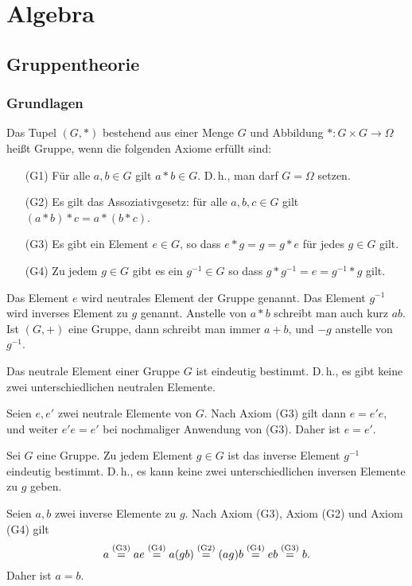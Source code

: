 
\chapter{Algebra}

\section{Gruppentheorie}

\subsection{Grundlagen}

\begin{Definition}[Gruppe]
Das Tupel $(G,*)$ bestehend aus einer Menge $G$ und
Abbildung $*\colon G\times G\to\Omega$ heißt Gruppe, wenn die folgenden
Axiome erfüllt sind:
\begin{enumerate}
\item[(G1)] Für alle $a,b\in G$ gilt $a*b\in G$. D.\,h., man darf $G=\Omega$ setzen.
\item[(G2)] Es gilt das Assoziativgesetz: für alle $a,b,c\in G$ gilt $(a*b)*c=a*(b*c)$.
\item[(G3)] Es gibt ein Element $e\in G$, so dass $e*g=g=g*e$ für jedes $g\in G$ gilt.
\item[(G4)] Zu jedem $g\in G$ gibt es ein $g^{-1}\in G$ so dass $g*g^{-1}=e=g^{-1}*g$ gilt.
\end{enumerate}
Das Element $e$ wird neutrales Element der Gruppe genannt.
Das Element $g^{-1}$ wird inverses Element zu $g$ genannt.
Anstelle von $a*b$ schreibt man auch kurz $ab$. Ist $(G,+)$ eine
Gruppe, dann schreibt man immer $a+b$, und $-g$ anstelle von $g^{-1}$.
\end{Definition}

\begin{Korollar}
Das neutrale Element einer Gruppe $G$ ist eindeutig bestimmt.
D.\,h., es gibt keine zwei unterschiedlichen neutralen Elemente. 
\end{Korollar}
\begin{Beweis}
Seien $e,e'$ zwei neutrale Elemente von $G$. Nach Axiom (G3)
gilt dann $e=e'e$, und weiter $e'e=e'$ bei nochmaliger Anwendung
von (G3). Daher ist $e=e'$.\;\qedsymbol
\end{Beweis}

\begin{Korollar}
Sei $G$ eine Gruppe. Zu jedem Element $g\in G$ ist das inverse
Element $g^{-1}$ eindeutig bestimmt. D.\,h., es kann keine zwei
unterschiedlichen inversen Elemente zu $g$ geben.
\end{Korollar}
\begin{Beweis}
Seien $a,b$ zwei inverse Elemente zu $g$. Nach Axiom (G3), Axiom (G2)
und Axiom (G4) gilt
\[a \stackrel{\mathrm{(G3)}}{=} ae \stackrel{\mathrm{(G4)}}{=} a(gb) \stackrel{\mathrm{(G2)}}{=} (ag)b \stackrel{\mathrm{(G4)}}{=} eb \stackrel{\mathrm{(G3)}}{=} b.\]
Daher ist $a=b$.\;\qedsymbol
\end{Beweis}

